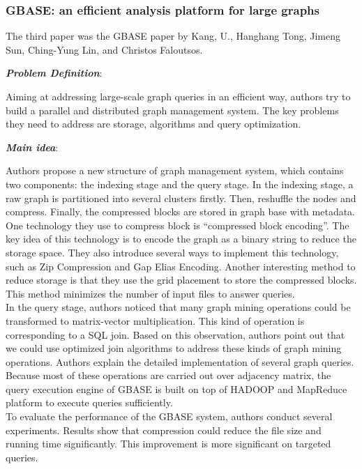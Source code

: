 \subsubsection{ GBASE: an efficient analysis platform for large graphs}
The third paper was the GBASE paper by Kang, U., Hanghang Tong, Jimeng Sun, Ching-Yung Lin, and Christos Faloutsos. 
\cite{kang2012gbase}
\begin{itemize*}
\item {\em \textbf{Problem Definition}}: 

Aiming at addressing large-scale graph queries in an efficient way, authors try to build a parallel and distributed graph management system. The key problems they need to address are storage, algorithms and query optimization. \\ 


\item {\em \textbf{Main idea}}: 

Authors propose a new structure of graph management system, which contains two components: the indexing stage and the query stage. In the indexing stage, a raw graph is partitioned into several clusters firstly. Then, reshuffle the nodes and compress. Finally, the compressed blocks are stored in graph base with metadata. One technology they use to compress block is “compressed block encoding”. The key idea of this technology is to encode the graph as a binary string to reduce the storage space. They also introduce several ways to implement this technology, such as Zip Compression and Gap Elias Encoding. Another interesting method to reduce storage is that they use the grid placement to store the compressed blocks. This method minimizes the number of input files to answer queries.  \\ 


In the query stage, authors noticed that many graph mining operations could be transformed to matrix-vector multiplication. This kind of operation is corresponding to a SQL join. Based on this observation, authors point out that we could use optimized join algorithms to address these kinds of graph mining operations. Authors explain the detailed implementation of several graph queries. Because most of these operations are carried out over adjacency matrix, the query execution engine of GBASE is built on top of HADOOP and MapReduce platform to execute queries sufficiently. \\ 


To evaluate the performance of the GBASE system, authors conduct several experiments.  Results show that compression could reduce the file size and running time significantly. This improvement is more significant on targeted queries.  \\ 



\end{itemize*}
